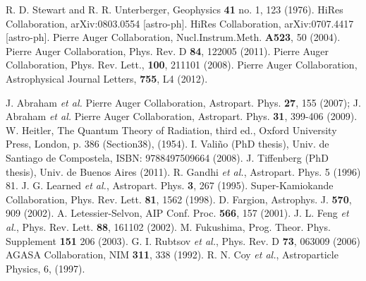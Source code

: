 \begin{thebibliography}{1}
 R. D. Stewart and R. R. Unterberger, Geophysics \textbf{41} no. 1, 123 (1976).
 HiRes Collaboration, arXiv:0803.0554 [astro-ph].
 HiRes Collaboration, arXiv:0707.4417 [astro-ph].
 Pierre Auger Collaboration, Nucl.Instrum.Meth. \textbf{A523},  50 (2004).
 Pierre Auger Collaboration, Phys. Rev. D \textbf{84}, 122005 (2011).
 Pierre Auger Collaboration, Phys. Rev. Lett., \textbf{100}, 211101 (2008).
 Pierre Auger Collaboration, Astrophysical Journal Letters, \textbf{755}, L4 (2012).

J. Abraham {\it et al.} Pierre Auger Collaboration, Astropart. Phys. \textbf{27}, 155 (2007);
J. Abraham {\it et al.} Pierre Auger Collaboration, Astropart. Phys. {\bf 31}, 399-406 (2009).
 W. Heitler, The Quantum Theory of Radiation, third ed., Oxford University Press, London, p. 386 (Section38), (1954).
 I. Vali\~no (PhD thesis), Univ. de Santiago de Compostela, ISBN: 9788497509664 (2008).
 J. Tiffenberg (PhD thesis), Univ. de Buenos Aires (2011).
 R. Gandhi {\it et al.}, Astropart. Phys. 5 (1996) 81.
 J. G. Learned {\it et al.}, Astropart. Phys. \textbf{3}, 267 (1995).
 Super-Kamiokande Collaboration, Phys. Rev. Lett. \textbf{81}, 1562 (1998). 
 D. Fargion, Astrophys. J. \textbf{570}, 909 (2002).
 A. Letessier-Selvon, AIP Conf. Proc. \textbf{566}, 157 (2001).
 J. L. Feng {\it et al.}, Phys. Rev. Lett. \textbf{88}, 161102 (2002).
 M. Fukushima, Prog. Theor. Phys. Supplement \textbf{151} 206 (2003). 
 G. I. Rubtsov {\it et al.}, Phys. Rev. D \textbf{73}, 063009 (2006)
 AGASA Collaboration, NIM \textbf{311}, 338 (1992).
 R. N. Coy {\it et al.}, Astroparticle Physics, 6, (1997).


\end{thebibliography}
